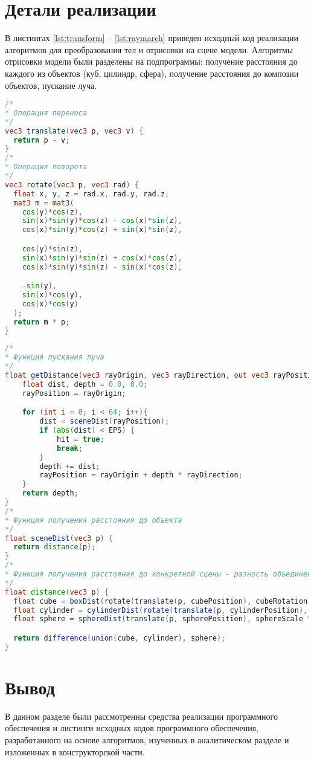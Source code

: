 \section{Детали реализации}
В листингах \ref{lst:transform} -- \ref{lst:raymarch} приведен исходный код реализации алгоритмов
для преобразования тел и отрисовки на сцене модели.
Алгоритмы отрисовки модели были разделены на подпрограммы:  
получение расстояния до каждого из объектов (куб, цилиндр, сфера), получение расстояния до композии объектов,
пускание луча.
\newpage
\begin{lstlisting}[language=GLSL, label=lst:transform, caption = {Реализация алгоритмов преобразования тела}]
/*
* Операция переноса
*/
vec3 translate(vec3 p, vec3 v) {
  return p - v;
}
/*
* Операция поворота
*/
vec3 rotate(vec3 p, vec3 rad) {
  float x, y, z = rad.x, rad.y, rad.z;
  mat3 m = mat3(
    cos(y)*cos(z),
    sin(x)*sin(y)*cos(z) - cos(x)*sin(z),
    cos(x)*sin(y)*cos(z) + sin(x)*sin(z),

    cos(y)*sin(z),
    sin(x)*sin(y)*sin(z) + cos(x)*cos(z),
    cos(x)*sin(y)*sin(z) - sin(x)*cos(z),

    -sin(y),
    sin(x)*cos(y),
    cos(x)*cos(y)
  );
  return m * p;
}
\end{lstlisting}
\begin{lstlisting}[language=GLSL, label=lst:raymarch, caption = {Реализация алгоритмов пускания луча для отрисовки поверхностей}]
/*
* Функция пускания луча
*/
float getDistance(vec3 rayOrigin, vec3 rayDirection, out vec3 rayPosition, out vec3 normal, out bool hit) {
    float dist, depth = 0.0, 0.0;
    rayPosition = rayOrigin;

    for (int i = 0; i < 64; i++){
        dist = sceneDist(rayPosition);
        if (abs(dist) < EPS) {
            hit = true;
            break;
        }
        depth += dist;
        rayPosition = rayOrigin + depth * rayDirection;
    }
    return depth;
}
/*
* Функция получения расстояния до объекта
*/
float sceneDist(vec3 p) {
  return distance(p);
}
/*
* Функция получения расстояния до конкретной сцены - разность объединения куба и цилиндра с сферой
*/
float distance(vec3 p) {
  float cube = boxDist(rotate(translate(p, cubePosition), cubeRotation), vec3(cubeScale * 2., cubeScale * 2., cubeScale * 2.));
  float cylinder = cylinderDist(rotate(translate(p, cylinderPosition), cylinderRotation), cylinderScale * 0.5, cylinderScale * 4.0);
  float sphere = sphereDist(translate(p, spherePosition), sphereScale * 1.);

  return difference(union(cube, cylinder), sphere);
}
\end{lstlisting}
\section{Вывод}
В данном разделе были рассмотренны средства реализации программного обеспечения и листинги исходных кодов программного обеспечения,
разработанного на основе алгоритмов, изученных в аналитическом разделе и изложенных в 
конструкторской части.
